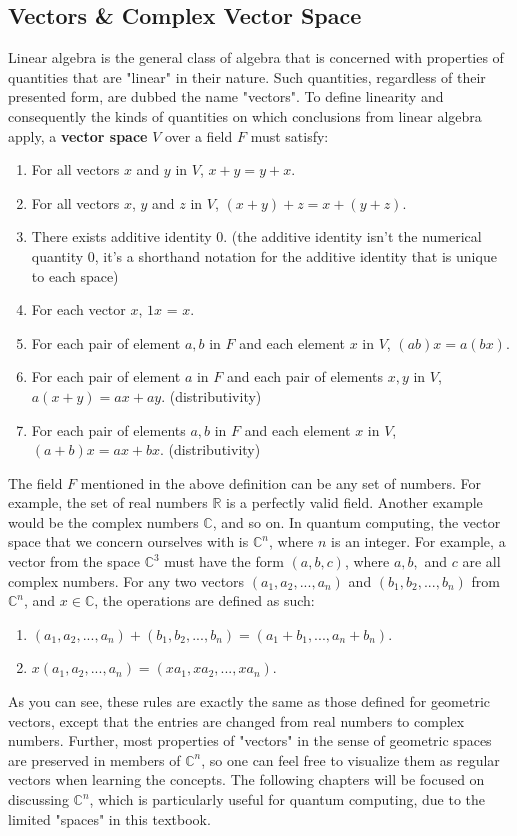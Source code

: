 \documentclass[12pt]{article}
\begin{document}
\subsection{Vectors \& Complex Vector Space}
Linear algebra is the general class of algebra that is concerned with properties of quantities that are "linear" in their nature. Such quantities, regardless of their presented form, are dubbed the name "vectors". To define linearity and consequently the kinds of quantities on which conclusions from linear algebra apply, a \textbf{vector space} $V$ over a field $F$ must satisfy:
\begin{enumerate}
    \item For all vectors $x$ and $y$ in $V$, $x+y=y+x$.
    \item For all vectors $x$, $y$ and $z$ in $V$, $(x+y)+z=x+(y+z)$.
    \item There exists additive identity 0. (the additive identity isn't the numerical quantity 0, it's a shorthand notation for the additive identity that is unique to each space)
    \item For each vector $x$, $1x$ = $x$.
    \item For each pair of element $a, b$ in $F$ and each element $x$ in $V$, $(ab)x=a(bx)$.
    \item For each pair of element $a$ in $F$ and each pair of elements $x,y$ in $V$, $a(x+y)=ax+ay$. (distributivity)
    \item For each pair of elements $a, b$ in $F$ and each element $x$ in $V$, $(a+b)x=ax+bx$. (distributivity)
\end{enumerate}
The field $F$ mentioned in the above definition can be any set of numbers. For example, the set of real numbers $\mathbb{R}$ is a perfectly valid field. Another example would be the complex numbers $\mathbb{C}$, and so on. In quantum computing, the vector space that we concern ourselves with is $\mathbb{C}^n$, where $n$ is an integer. For example, a vector from the space $\mathbb{C}^3$ must have the form $(a,b,c)$, where $a, b,$ and $c$ are all complex numbers. For any two vectors $(a_1, a_2, ..., a_n)$ and $(b_1, b_2, ..., b_n)$ from $\mathbb{C}^n$, and $x\in \mathbb{C}$, the operations are defined as such:
\begin{enumerate}
    \item $(a_1, a_2, ..., a_n)+(b_1, b_2, ..., b_n)=(a_1+b_1, ... , a_n+b_n)$.
    \item $x(a_1, a_2, ..., a_n)=(x a_1, x a_2, ..., xa_n)$.
\end{enumerate}
As you can see, these rules are exactly the same as those defined for geometric vectors, except that the entries are changed from real numbers to complex numbers. Further, most properties of "vectors" in the sense of geometric spaces are preserved in members of $\mathbb{C}^n$, so one can feel free to visualize them as regular vectors when learning the concepts. The following chapters will be focused on discussing $\mathbb{C}^n$, which is particularly useful for quantum computing, due to the limited "spaces" in this textbook.
\end{document}
